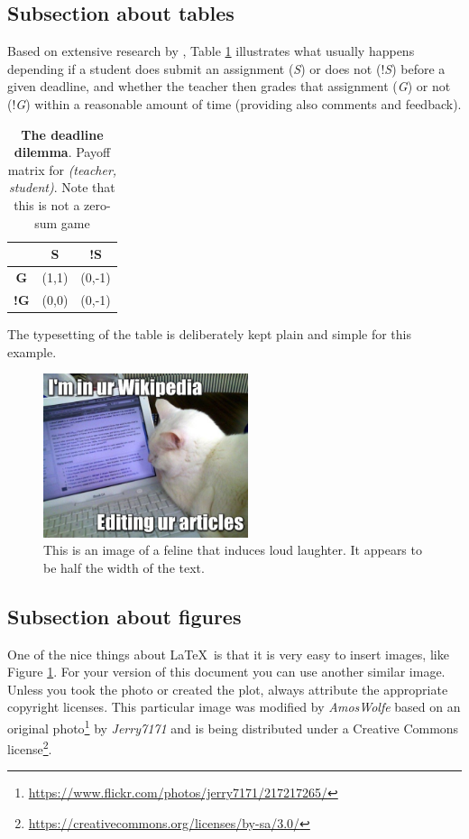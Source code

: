 \documentclass[10pt]{article}
\begin{document}
\subsection{Subsection about tables} \label{subtables}
\par{Based on extensive research by \cite{alissandrakis}, Table \ref{table:1} illustrates what usually happens
	depending if a student does submit an assignment (\textit {S}) or does not (!\textit {S}) before
	a given deadline, and whether the teacher then grades that assignment (\textit{G})
	or not (!\textit{G}) within a reasonable amount of time (providing also comments
	and feedback).}
\begin{table}[H] 
	\centering
	\begin{tabular}{ c|cc }
		 & \textbf{S} & \textbf{!S} \\ 
		\hline
		\textbf{G} & (1,1) & (0,-1) \\ 
		\hline
		\textbf{!G} & (0,0) & (0,-1) \\ 
	\end{tabular}
\caption[The deadline dilemma]{\noindent \textbf{The deadline dilemma}. Payoff matrix for \textit{(teacher, student)}. Note that this is not a zero-sum game}
\label{table:1}
\end{table} 
\par The typesetting of the table is deliberately kept plain and simple for this example.
\begin{figure}[t]
	\includegraphics[width=6cm]{images/4ME301HT19-LaTeX-gauci}
	\centering
	\caption[Image of a lolcat]{\noindent This is an image of a feline that induces loud laughter. It appears to be half the width of the text.}
	\label{figure:1}
\end{figure}
\subsection{Subsection about figures} \label{subfig}
\par{One of the nice things about \LaTeX~is that it is very easy to insert images, like Figure \ref{figure:1}. For your version of this document you can use another similar image. Unless you took the photo or created the plot, always attribute the appropriate copyright licenses. This particular image was modified by \textit{AmosWolfe} based on an original photo\footnote{\url {https://www.flickr.com/photos/jerry7171/217217265/}} by \textit{Jerry7171} and is being distributed under a Creative Commons license\footnote{\url{https://creativecommons.org/licenses/by-sa/3.0/}}}.
\end{document}
